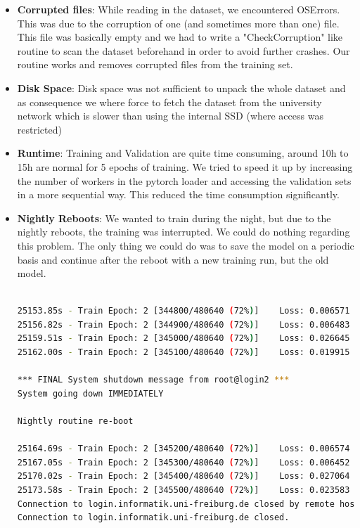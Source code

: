 \documentclass[a4paper]{article}
\begin{document}
\begin{itemize}
	\item \textbf{Corrupted files}: While reading in the dataset, we encountered OSErrors. This was due to the corruption of one (and sometimes more than one) file. This file was basically empty and we had to write a "CheckCorruption" like routine to scan the dataset beforehand in order to avoid further crashes. Our routine works and removes corrupted files from the training set.
	\item \textbf{Disk Space}: Disk space was not sufficient to unpack the whole dataset and as consequence we where force to fetch the dataset from the university network which is slower than using the internal SSD (where access was restricted)
	\item \textbf{Runtime}: Training and Validation are quite time consuming, around 10h to 15h are normal for 5 epochs of training. We tried to speed it up by increasing the number of workers in the pytorch loader and accessing the validation sets in a more sequential way. This reduced the time consumption significantly.
	\clearpage
	\item \textbf{Nightly Reboots}: We wanted to train during the night, but due to the nightly reboots, the training was interrupted. We could do nothing regarding this problem. The only thing we could do was to save the model on a periodic basis and continue after the reboot with a new training run, but the old model.
	
\begin{lstlisting}[language=bash, caption={Nigthly Reboot Interruption}]

25153.85s - Train Epoch: 2 [344800/480640 (72%)]    Loss: 0.006571
25156.82s - Train Epoch: 2 [344900/480640 (72%)]    Loss: 0.006483
25159.51s - Train Epoch: 2 [345000/480640 (72%)]    Loss: 0.026645
25162.00s - Train Epoch: 2 [345100/480640 (72%)]    Loss: 0.019915
                                                                               
*** FINAL System shutdown message from root@login2 ***                       
System going down IMMEDIATELY                                                  
                                                                               
Nightly routine re-boot                                                        
                                                                               
25164.69s - Train Epoch: 2 [345200/480640 (72%)]    Loss: 0.006574
25167.05s - Train Epoch: 2 [345300/480640 (72%)]    Loss: 0.006452
25170.02s - Train Epoch: 2 [345400/480640 (72%)]    Loss: 0.027064
25173.58s - Train Epoch: 2 [345500/480640 (72%)]    Loss: 0.023583
Connection to login.informatik.uni-freiburg.de closed by remote host.
Connection to login.informatik.uni-freiburg.de closed.


\end{lstlisting}
\end{itemize}
\end{document}
